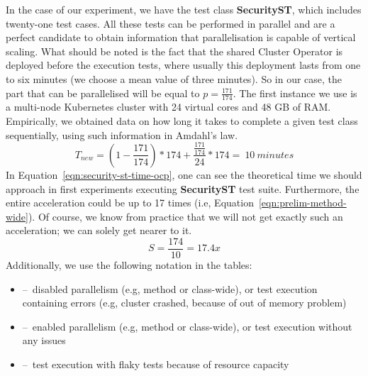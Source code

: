 In the case of our experiment, we have the test class \textbf {SecurityST}, which includes twenty-one test cases.
All these tests can be performed in parallel and are a perfect candidate to obtain information that parallelisation is capable of vertical scaling.
What should be noted is the fact that the shared Cluster Operator is deployed before the execution tests, where usually this deployment lasts from one to six minutes (we choose a mean value of three minutes).
So in our case, the part that can be parallelised will be equal to $p = \frac{171}{174}$.
The first instance we use is a multi-node Kubernetes cluster with 24 virtual cores and 48 GB of RAM.
Empirically, we obtained data on how long it takes to complete a given test class sequentially, using such information in Amdahl's law.
\begin{equation}
    \label{eqn:security-st-time-ocp}
    T_{new} = (1 - \frac{171}{174}) * 174 +  \frac{\frac{171}{174}}{24} * 174 =~10~minutes
    \tag{6}
\end{equation}
In Equation~\eqref{eqn:security-st-time-ocp}, one can see the theoretical time we should approach in first experiments executing \textbf{SecurityST} test suite.
Furthermore, the entire acceleration could be up to 17 times (i.e, Equation~\eqref{eqn:prelim-method-wide}).
Of course, we know from practice that we will not get exactly such an acceleration;
we can solely get nearer to it.
\begin{equation}
    \label{eqn:prelim-method-wide}
    S = \frac{174}{10} =17.4x
    \tag{7}
\end{equation}
Additionally, we use the following notation in the tables:
\begin{itemize}[itemsep=1mm, parsep=0pt]
    \item {\xmark} \---\ disabled parallelism (e.g, method or class-wide), or test execution containing errors (e.g, cluster crashed, because of out of memory problem)
    \item {\cmark} \---\ enabled parallelism (e.g, method or class-wide), or test execution without any issues
    \item {\selectfont{}\relax} \---\ test execution with flaky tests because of resource capacity
\end{itemize}

